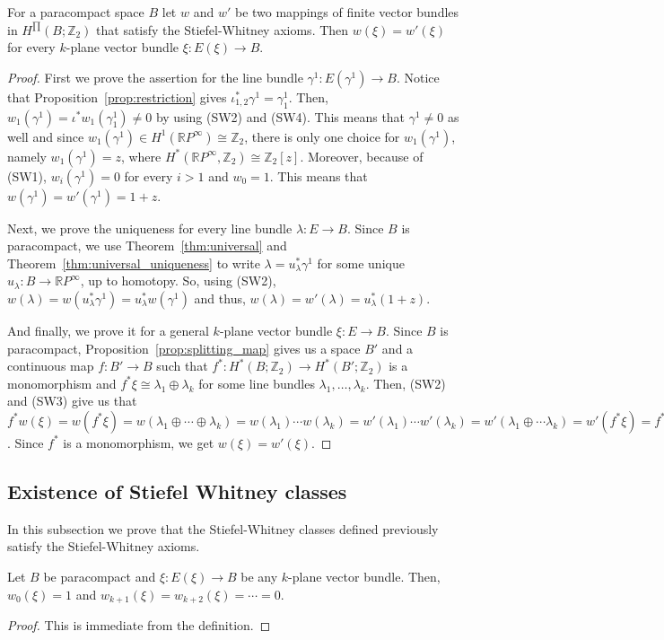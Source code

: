 \begin{theorem} For a paracompact space $B$ let $w$ and $w'$ be two mappings of finite vector bundles in $H^{\prod}(B;\mathbb{Z}_2)$ that satisfy the Stiefel-Whitney axioms. Then $w(\xi)=w'(\xi)$ for every $k$-plane vector bundle $\xi:E(\xi)\to B$.
\end{theorem}
\begin{proof} First we prove the assertion for the line bundle $\gamma^1:E(\gamma^1)\to B$. Notice that Proposition~\ref{prop:restriction} gives $\iota_{1,2}^*\gamma^1=\gamma_1^1$. Then, $w_1(\gamma^1)=\iota^*w_1(\gamma_1^1)\neq0$ by using (SW2) and (SW4). This means that $\gamma^1\neq0$ as well and since $w_1(\gamma^1)\in H^1(\mathbb{R}P^{\infty})\cong\mathbb{Z}_2$, there is only one choice for $w_1(\gamma^1)$, namely $w_1(\gamma^1)=z$, where $H^*(\mathbb{R}P^{\infty},\mathbb{Z}_2)\cong\mathbb{Z}_2[z]$. Moreover, because of (SW1), $w_i(\gamma^1)=0$ for every $i>1$ and $w_0=1$. This means that $w(\gamma^1)=w'(\gamma^1)=1+z$.

Next, we prove the uniqueness for every line bundle $\lambda:E\to B$. Since $B$ is paracompact, we use Theorem~\ref{thm:universal} and Theorem~\ref{thm:universal_uniqueness} to write $\lambda=u_{\lambda}^*\gamma^1$ for some unique $u_{\lambda}:B\to\mathbb{R}P^{\infty}$, up to homotopy. So, using (SW2), $w(\lambda)=w(u_{\lambda}^*\gamma^1)=u_{\lambda}^*w(\gamma^1)$ and thus, $w(\lambda)=w'(\lambda)=u_{\lambda}^*(1+z)$.

And finally, we prove it for a general $k$-plane vector bundle $\xi:E\to B$. Since $B$ is paracompact, Proposition~\ref{prop:splitting_map} gives us a space $B'$ and a continuous map $f:B'\to B$ such that $f^*:H^*(B;\mathbb{Z}_2)\to H^*(B';\mathbb{Z}_2)$ is a monomorphism and $f^*\xi\cong\lambda_1\oplus\lambda_k$ for some line bundles $\lambda_1,\ldots,\lambda_k$. Then, (SW2) and (SW3) give us that $f^*w(\xi)=w(f^*\xi)=w(\lambda_1\oplus\cdots\oplus\lambda_k)=w(\lambda_1)\cdots w(\lambda_k)=w'(\lambda_1)\cdots w'(\lambda_k)=w'(\lambda_1\oplus\cdots\lambda_k)=w'(f^*\xi)=f^*w'(\xi)$. Since $f^*$ is a monomorphism, we get $w(\xi)=w'(\xi)$.
\end{proof}

\subsection{Existence of Stiefel Whitney classes}
In this subsection we prove that the Stiefel-Whitney classes defined previously satisfy the Stiefel-Whitney axioms.
\begin{proposition} Let $B$ be paracompact and $\xi:E(\xi)\to B$ be any $k$-plane vector bundle. Then, $w_0(\xi)=1$ and $w_{k+1}(\xi)=w_{k+2}(\xi)=\cdots=0$.
\end{proposition}
\begin{proof} This is immediate from the definition.
\end{proof}


